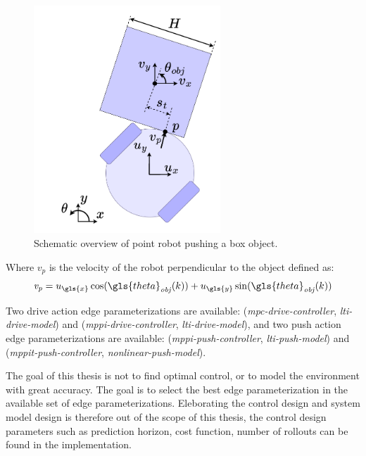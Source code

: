 \begin{figure}[H]
    \centering
    \includegraphics[width=7cm]{figures/results/robot_and_square_object.drawio}
    \caption{Schematic overview of point robot pushing a box object.}%
    \label{fig:robot_and_square_object}
\end{figure}

Where $v_p$ is the velocity of the robot perpendicular to the object defined as:\bs
\[ \mathit{v_p} = u_{\gls{x}} \cos(\gls{theta}_{\mathit{obj}}(k)) + u_{\gls{y}}\sin(\gls{theta}_{\mathit{obj}}(k)) \]

Two drive action edge parameterizations are available: (\textit{mpc-drive-controller}, \textit{lti-drive-model}) and (\textit{mppi-drive-controller}, \textit{lti-drive-model}), and two push action edge parameterizations are available: (\textit{mppi-push-controller}, \textit{lti-push-model}) and (\textit{mppit-push-controller}, \textit{nonlinear-push-model}).\bs

The goal of this thesis is not to find optimal control, or to model the environment with great accuracy. The goal is to select the best edge parameterization in the available set of edge parameterizations. Eleborating the control design and system model design is therefore out of the scope of this thesis, the control design parameters such as prediction horizon, cost function, number of rollouts can be found in the implementation.\bs

